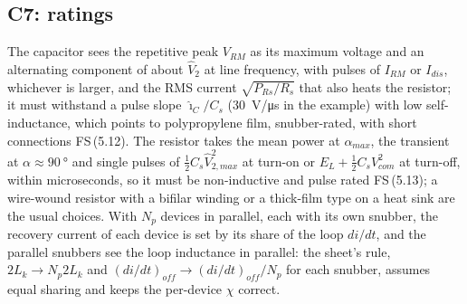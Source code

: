 \documentclass[10pt,a4paper]{scrartcl}
\newcommand{\Lk}{L_{k}}
\newcommand{\fs}[1]{\textsf{FS}\,(#1)}
\begin{document}
\subsection{C7: ratings}
The capacitor sees the repetitive peak $V_{RM}$ as its maximum voltage and an alternating component of about $\hat V_2$ at line frequency, with pulses of $I_{RM}$ or $I_{dis}$, whichever is larger, and the RMS current $\sqrt{P_{Rs}/R_s}$ that also heats the resistor; it must withstand a pulse slope $\hat\imath_C/C_s$ (\SI{30}{V/\micro s} in the example) with low self-inductance, which points to polypropylene film, snubber-rated, with short connections \fs{5.12}. The resistor takes the mean power at $\alpha_{max}$, the transient at $\alpha\approx\SI{90}{\degree}$ and single pulses of $\tfrac12C_s\hat V_{2,max}^2$ at turn-on or $E_L + \tfrac12C_sV_{com}^2$ at turn-off, within microseconds, so it must be non-inductive and pulse rated \fs{5.13}; a wire-wound resistor with a bifilar winding or a thick-film type on a heat sink are the usual choices. With $N_p$ devices in parallel, each with its own snubber, the recovery current of each device is set by its share of the loop $di/dt$, and the parallel snubbers see the loop inductance in parallel: the sheet's rule, $2\Lk\to N_p2\Lk$ and $(di/dt)_{off}\to(di/dt)_{off}/N_p$ for each snubber, assumes equal sharing and keeps the per-device $\chi$ correct.
\end{document}

